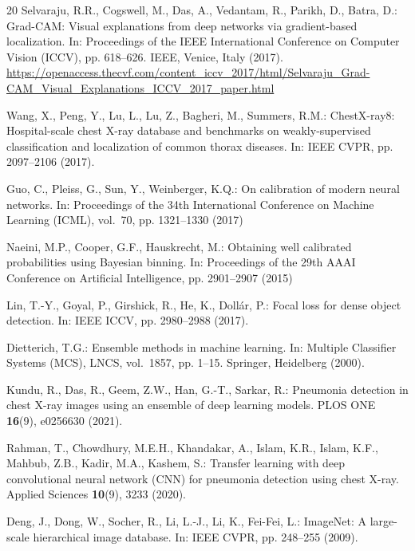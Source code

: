\documentclass[runningheads]{llncs}
\begin{document}
\begin{thebibliography}{20}
Selvaraju, R.R., Cogswell, M., Das, A., Vedantam, R., Parikh, D., Batra, D.:
Grad-CAM: Visual explanations from deep networks via gradient-based
localization. In: Proceedings of the IEEE International Conference on
Computer Vision (ICCV), pp. 618--626. IEEE, Venice, Italy (2017).
\url{https://openaccess.thecvf.com/content_iccv_2017/html/Selvaraju_Grad-CAM_Visual_Explanations_ICCV_2017_paper.html}


Wang, X., Peng, Y., Lu, L., Lu, Z., Bagheri, M., Summers, R.M.:
ChestX-ray8: Hospital-scale chest X-ray database and benchmarks on
weakly-supervised classification and localization of common thorax
diseases. In: IEEE CVPR, pp. 2097--2106 (2017).

Guo, C., Pleiss, G., Sun, Y., Weinberger, K.Q.: On calibration of modern
neural networks. In: Proceedings of the 34th International Conference on
Machine Learning (ICML), vol.~70, pp. 1321--1330 (2017)

Naeini, M.P., Cooper, G.F., Hauskrecht, M.: Obtaining well calibrated
probabilities using Bayesian binning. In: Proceedings of the 29th AAAI
Conference on Artificial Intelligence, pp. 2901--2907 (2015)

Lin, T.-Y., Goyal, P., Girshick, R., He, K., Doll\'ar, P.: Focal loss for
dense object detection. In: IEEE ICCV, pp. 2980--2988 (2017).

Dietterich, T.G.: Ensemble methods in machine learning. In: Multiple
Classifier Systems (MCS), LNCS, vol.~1857, pp. 1--15. Springer, Heidelberg
(2000). 

Kundu, R., Das, R., Geem, Z.W., Han, G.-T., Sarkar, R.: Pneumonia detection
in chest X-ray images using an ensemble of deep learning models. PLOS ONE
\textbf{16}(9), e0256630 (2021). 

Rahman, T., Chowdhury, M.E.H., Khandakar, A., Islam, K.R., Islam, K.F.,
Mahbub, Z.B., Kadir, M.A., Kashem, S.: Transfer learning with deep
convolutional neural network (CNN) for pneumonia detection using chest
X-ray. Applied Sciences \textbf{10}(9), 3233 (2020).

Deng, J., Dong, W., Socher, R., Li, L.-J., Li, K., Fei-Fei, L.: ImageNet: A
large-scale hierarchical image database. In: IEEE CVPR, pp. 248--255
(2009). 


\end{thebibliography}
\end{document}
